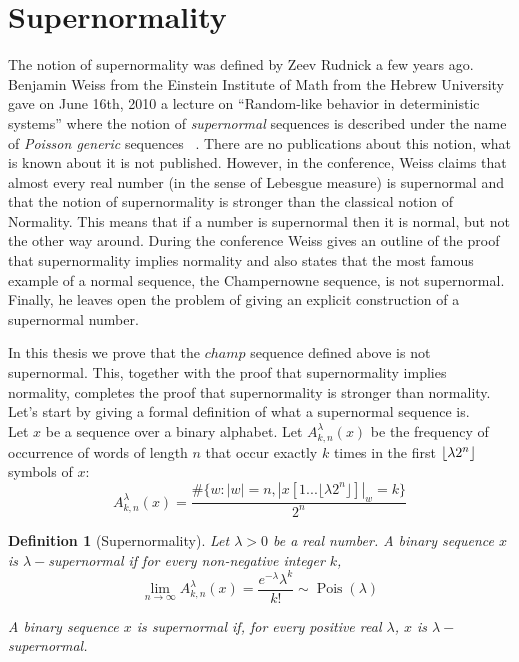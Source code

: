 \documentclass[11pt,a4paper]{tesis}
\newtheorem{definition}{Definition}[]
\DeclarePairedDelimiter{\floor}{\lfloor}{\rfloor}
\begin{document}
\section{Supernormality}


The notion of supernormality was defined by Zeev Rudnick a few years ago. Benjamin Weiss from the Einstein Institute of Math from the Hebrew University gave on June 16th, 2010 a lecture on “Random-like behavior in deterministic systems”  where the notion of \textit{supernormal} sequences is described under the name of \textit{Poisson generic} sequences ~\cite{Weiss}.
There are no publications about this notion, what is known about it is  not published. 
However, in the conference, Weiss claims that almost every real number (in the sense of Lebesgue measure)
 is supernormal and that the notion of supernormality is stronger than the classical notion of Normality. This means that if a number is supernormal then it is normal, but not the other way around. 
During the conference Weiss gives an outline of the proof that supernormality implies normality and also states that the most famous example of a normal sequence, the Champernowne sequence, is not supernormal.
Finally, he leaves open the problem of giving an explicit construction of a supernormal number.

In this thesis we prove that the $champ$ sequence defined above is not supernormal. 
This, together with the proof that supernormality implies normality, completes the proof that supernormality is stronger than normality.
Let's start by giving a formal definition of what a supernormal sequence is.
\\

Let $x$ be a sequence over a binary alphabet.
Let $A^\lambda_{k,n}(x)$ be the frequency of occurrence of words of length $n$ that occur exactly $k$ times in the first $\floor{\lambda 2^n}$ symbols of $x$:
$$A^\lambda_{k,n}(x) = \frac{\#\{w: |w| = n  , |x[1...\lfloor\lambda 2^n\rfloor]|_w = k\}}{2^n}$$

\begin{definition}[Supernormality]
    Let $\lambda > 0$ be a real number. 
   A binary sequence $x$ is $\lambda-$supernormal if  for every non-negative integer $k$,
 $$\lim_{n\to\infty} A^\lambda_{k,n}(x) = \frac{e^{-\lambda}\lambda^k}{k!} \sim {\operatorname {Pois} } (\lambda) $$
%

    A binary sequence $x$ is \textit{supernormal} if,  for every positive real $\lambda$, $x$ is $\lambda-$supernormal.
\end{definition}
\end{document}
